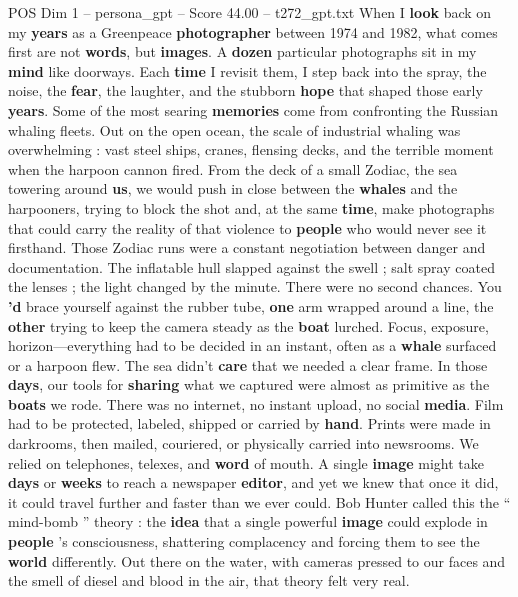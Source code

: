 \begin{textsample}{POS Dim 1 – persona\_gpt – Score 44.00 – t272\_gpt.txt}  \label{ex:f1_pos_026}
When I \textbf{look} back on my \textbf{years} as a Greenpeace \textbf{photographer} between 1974 and 1982, what comes first are not \textbf{words}, but \textbf{images}.
A \textbf{dozen} particular photographs sit in my \textbf{mind} like doorways.
Each \textbf{time} I revisit them, I step back into the spray, the noise, the \textbf{fear}, the laughter, and the stubborn \textbf{hope} that shaped those early \textbf{years}.
Some of the most searing \textbf{memories} come from confronting the Russian whaling fleets.
Out on the open ocean, the scale of industrial whaling was overwhelming : vast steel ships, cranes, flensing decks, and the terrible moment when the harpoon cannon fired.
From the deck of a small Zodiac, the sea towering around \textbf{us}, we would push in close between the \textbf{whales} and the harpooners, trying to block the shot and, at the same \textbf{time}, make photographs that could carry the reality of that violence to \textbf{people} who would never see it firsthand.
Those Zodiac runs were a constant negotiation between danger and documentation.
The inflatable hull slapped against the swell ; salt spray coated the lenses ; the light changed by the minute.
There were no second chances.
You \textbf{’d} brace yourself against the rubber tube, \textbf{one} arm wrapped around a line, the \textbf{other} trying to keep the camera steady as the \textbf{boat} lurched.
Focus, exposure, horizon—everything had to be decided in an instant, often as a \textbf{whale} surfaced or a harpoon flew.
The sea didn't \textbf{care} that we needed a clear frame.
In those \textbf{days}, our tools for \textbf{sharing} what we captured were almost as primitive as the \textbf{boats} we rode.
There was no internet, no instant upload, no social \textbf{media}.
Film had to be protected, labeled, shipped or carried by \textbf{hand}.
Prints were made in darkrooms, then mailed, couriered, or physically carried into newsrooms.
We relied on telephones, telexes, and \textbf{word} of mouth.
A single \textbf{image} might take \textbf{days} or \textbf{weeks} to reach a newspaper \textbf{editor}, and yet we knew that once it did, it could travel further and faster than we ever could.
Bob Hunter called this the “ mind-bomb ” theory : the \textbf{idea} that a single powerful \textbf{image} could explode in \textbf{people} ’s consciousness, shattering complacency and forcing them to see the \textbf{world} differently.
Out there on the water, with cameras pressed to our faces and the smell of diesel and blood in the air, that theory felt very real.

\end{textsample}
